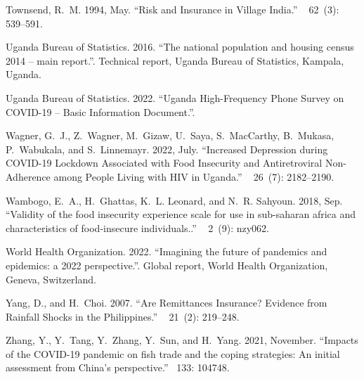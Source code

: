 \documentclass{wber}
\begin{document}
\begin{thebibliography}{}
Townsend, R.~M. 1994, May.
\newblock ``Risk and {Insurance} in {Village} {India}.''
~{ 62\/}~(3): 539--591.

{Uganda Bureau of Statistics}. 2016.
\newblock ``The national population and housing census 2014 -- main report.''.
\newblock Technical report, Uganda Bureau of Statistics, Kampala, Uganda.

{Uganda Bureau of Statistics}. 2022.
\newblock ``Uganda {High}-{Frequency} {Phone} {Survey} on {COVID}-19 -- {Basic}
  {Information} {Document}.''.

Wagner, G.~J., Z.~Wagner, M.~Gizaw, U.~Saya, S.~MacCarthy, B.~Mukasa,
  P.~Wabukala, and S.~Linnemayr. 2022, July.
\newblock ``Increased {Depression} during {COVID}-19 {Lockdown} {Associated}
  with {Food} {Insecurity} and {Antiretroviral} {Non}-{Adherence} among
  {People} {Living} with {HIV} in {Uganda}.''
~{ 26\/}~(7): 2182--2190.

Wambogo, E.~A., H.~Ghattas, K.~L. Leonard, and N.~R. Sahyoun. 2018, Sep.
\newblock ``Validity of the food insecurity experience scale for use in
  sub-saharan africa and characteristics of food-insecure individuals..''
~{ 2\/}~(9): nzy062.

{World Health Organization}. 2022.
\newblock ``Imagining the future of pandemics and epidemics: a 2022
  perspective.''.
\newblock Global report, {World Health Organization}, Geneva, Switzerland.

Yang, D., and H.~Choi. 2007.
\newblock ``Are {Remittances} {Insurance}? {Evidence} from {Rainfall} {Shocks}
  in the {Philippines}.''
~{ 21\/}~(2): 219--248.

Zhang, Y., Y.~Tang, Y.~Zhang, Y.~Sun, and H.~Yang. 2021, November.
\newblock ``Impacts of the {COVID}-19 pandemic on fish trade and the coping
  strategies: {An} initial assessment from {China}'s perspective.''
~{133}: 104748.

\end{thebibliography}
\end{document}
